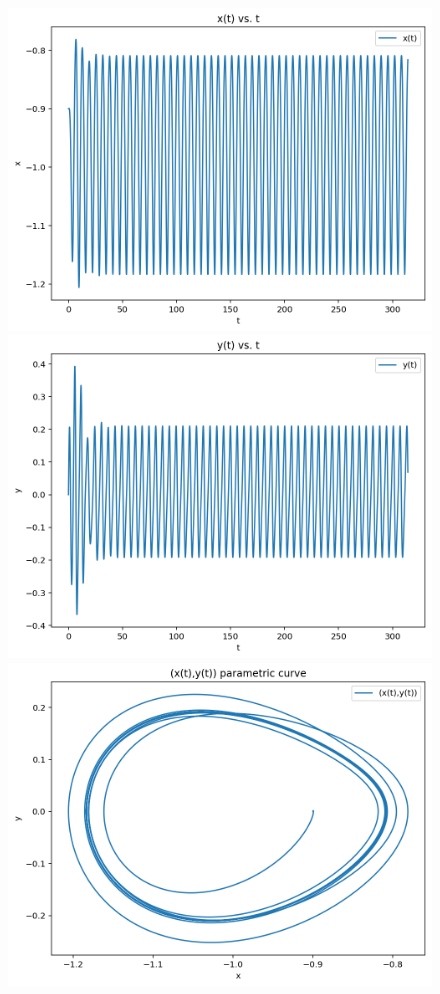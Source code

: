 \documentclass{article}
\begin{document}
\begin{figure}[h!]
\centering
\includegraphics[scale=0.4]{x(t)1.png}
\includegraphics[scale=0.4]{y(t)1.png}
\includegraphics[scale=0.4]{parametriccurve1.png}

\end{figure}
\end{document}
